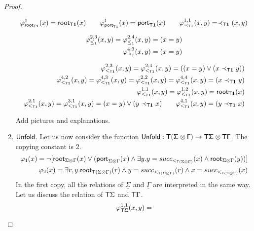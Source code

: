 \begin{proof}
\begin{enumerate}
\begin{align*}
\varphi^1_{\mathsf{root}_{\mathsf T\mathbf{1}}}(x)=\mathsf{root}_{\mathsf T\mathbf{1}}(x) \qquad \varphi^1_{\mathsf{port}_{\mathsf T\mathbf{1}}}(x)=\mathsf{port}_{\mathsf T\mathbf{1}}(x)
\qquad\varphi^{1,1}_{\prec_{\mathsf T\mathbf{1}}}(x,y)=\prec_{\mathsf T\mathbf{1}}(x,y) 
\end{align*}

\begin{align*}
\varphi^{2,3}_{\leq_{\mathbf{1}}}(x,y) = \varphi^{2,4}_{\leq_{\mathbf{1}}}(x,y) = (x=y)\\
\varphi^{4,3}_{\prec_{\mathbf{1}}}(x,y) =(x=y)
\end{align*}

\begin{align*}
\varphi^{2,3}_{<_{\mathsf T\mathbf{1}}}(x,y)= \varphi^{2,4}_{<_{\mathsf T\mathbf{1}}}(x,y)= ((x=y) \vee (x\prec_{\mathsf T\mathbf{1}} y))\\
\varphi^{4,2}_{<_{\mathsf T\mathbf{1}}}(x,y)=\varphi^{4,3}_{<_{\mathsf T\mathbf{1}}}(x,y)=\varphi^{2,2}_{<_{\mathsf T\mathbf{1}}}(x,y)= \varphi^{4,4}_{<_{\mathsf T\mathbf{1}}}(x,y)= (x\prec_{\mathsf T\mathbf{1}} y)\\
\varphi^{1,1}_{<_{\mathsf T\mathbf{1}}}(x,y)=\varphi^{1,2}_{<_{\mathsf T\mathbf{1}}}(x,y)= \mathsf{root}_{\mathsf T\mathbf{1}}(x)\\
\varphi^{2,1}_{<_{\mathsf T\mathbf{1}}}(x,y)=\varphi^{3,1}_{<_{\mathsf T\mathbf{1}}}(x,y)=(x=y) \vee (y\prec_{\mathsf T\mathbf{1}} x)\qquad 
\varphi^{4,1}_{<_{\mathsf T\mathbf{1}}}(x,y)=(y\prec_{\mathsf T\mathbf{1}} x)
\end{align*}
\begin{center}
Add pictures and explanations.
\end{center}
\item $\sf{Unfold}$. Let us now consider the function $\sf{Unfold}:\mathsf T(\Sigma\otimes \Gamma)\to \mathsf T\Sigma\otimes\mathsf T\Gamma$. The copying constant is 2. 
\begin{align*}
\varphi_1(x)=\neg [\mathsf{root}_{\Sigma\otimes\Gamma}(x)\vee (\mathsf{port}_{\Sigma\otimes\Gamma}(x)\wedge \exists y. y=succ_{<_{\mathsf T(\Sigma\otimes\Gamma)}}(x) \wedge \mathsf{root}_{\Sigma\otimes\Gamma}(y))]\\
\varphi_2(x)=\exists r, y. \mathsf{root}_{\mathsf T(\Sigma\otimes\Gamma)}(r) \wedge y=succ_{<_{\mathsf T(\Sigma\otimes\Gamma)}}(r) \wedge x= succ_{<_{\mathsf T(\Sigma\otimes\Gamma)}}(x) 
\end{align*}
In the first copy, all the relations of $\underline{\Sigma}$ and $\underline{\Gamma}$ are interpreted in the same way. 
Let us discuss the relation of $\mathsf T\Sigma$ and $\mathsf T\Gamma$.
\[\varphi^{1,1}_{\mathsf T\Sigma}(x,y)=\] 
\end{enumerate} 

 \end{proof}